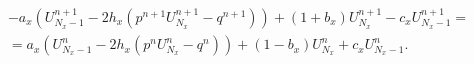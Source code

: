 \documentclass[a4paper,12pt]{article}
\begin{document}
\begin{multline*}
  - a_x \left( U^{n+1}_{N_x-1} - 2 h_x \left( p^{n+1} U^{n+1}_{N_x} - q^{n+1} \right) \right) + \left( 1 + b_x \right) U^{n+1}_{N_x} - c_x U^{n+1}_{N_x-1} = \\
  = a_x \left(U^{n}_{N_x-1} - 2 h_x \left( p^n U^n_{N_x} - q^{n} \right) \right) + \left(1 - b_x  \right) U^{n}_{N_x} + c_x U^{n}_{N_x-1}.
\end{multline*}
\end{document}
